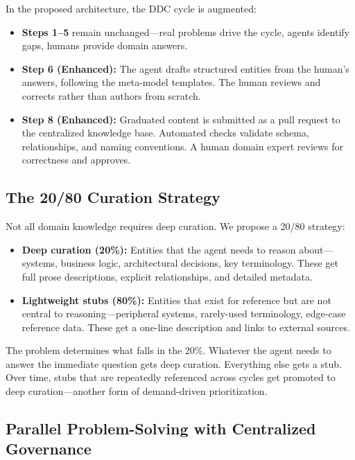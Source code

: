 \documentclass[11pt,a4paper]{article}
\begin{document}
In the proposed architecture, the DDC cycle is augmented:

\begin{itemize}
  \item \textbf{Steps 1--5} remain unchanged---real problems drive the cycle, agents identify gaps, humans provide domain answers.
  \item \textbf{Step 6 (Enhanced):} The agent drafts structured entities from the human's answers, following the meta-model templates. The human reviews and corrects rather than authors from scratch.
  \item \textbf{Step 8 (Enhanced):} Graduated content is submitted as a pull request to the centralized knowledge base. Automated checks validate schema, relationships, and naming conventions. A human domain expert reviews for correctness and approves.
\end{itemize}

\subsection{The 20/80 Curation Strategy}

Not all domain knowledge requires deep curation. We propose a 20/80 strategy:

\begin{itemize}
  \item \textbf{Deep curation (20\%):} Entities that the agent needs to reason about---systems, business logic, architectural decisions, key terminology. These get full prose descriptions, explicit relationships, and detailed metadata.
  \item \textbf{Lightweight stubs (80\%):} Entities that exist for reference but are not central to reasoning---peripheral systems, rarely-used terminology, edge-case reference data. These get a one-line description and links to external sources.
\end{itemize}

The problem determines what falls in the 20\%. Whatever the agent needs to answer the immediate question gets deep curation. Everything else gets a stub. Over time, stubs that are repeatedly referenced across cycles get promoted to deep curation---another form of demand-driven prioritization.

\subsection{Parallel Problem-Solving with Centralized Governance}
\end{document}
